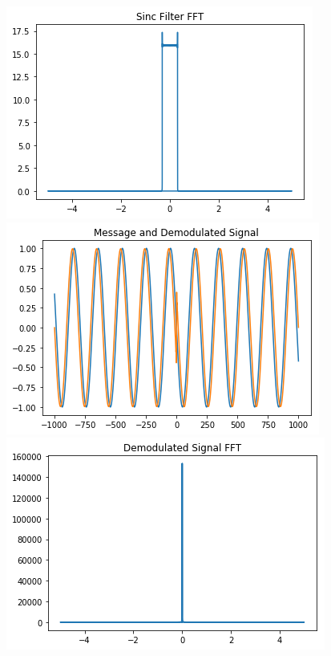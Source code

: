 \documentclass[12pt,a4paper]{article}%
\begin{document}
\begin{flushleft}
\begin{center}
			{\includegraphics[width=0.80 \textwidth]{./images/sinc_fft.PNG}}
			{\includegraphics[width=0.80 \textwidth]{./images/demod.PNG}}\\\bigskip
			{\includegraphics[width=0.80 \textwidth]{./images/demod_fft.PNG}}
		\end{center}
	\end{flushleft}
\end{document}
